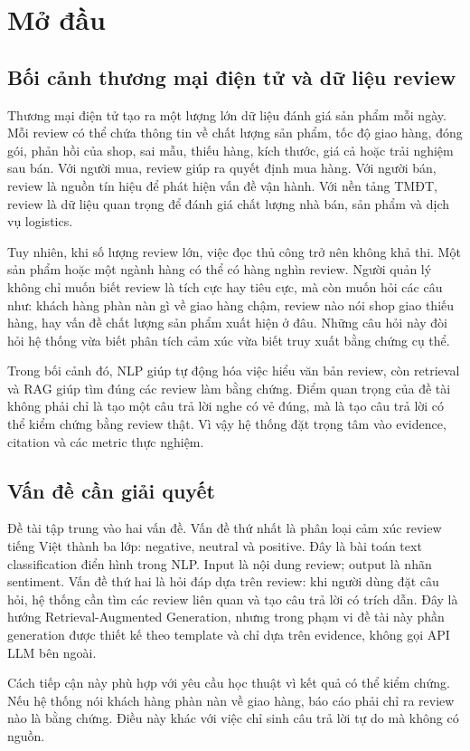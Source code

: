 \chapter{Mở đầu}
\section{Bối cảnh thương mại điện tử và dữ liệu review}
Thương mại điện tử tạo ra một lượng lớn dữ liệu đánh giá sản phẩm mỗi ngày. Mỗi review có thể chứa thông tin về chất lượng sản phẩm, tốc độ giao hàng, đóng gói, phản hồi của shop, sai mẫu, thiếu hàng, kích thước, giá cả hoặc trải nghiệm sau bán. Với người mua, review giúp ra quyết định mua hàng. Với người bán, review là nguồn tín hiệu để phát hiện vấn đề vận hành. Với nền tảng TMĐT, review là dữ liệu quan trọng để đánh giá chất lượng nhà bán, sản phẩm và dịch vụ logistics.

Tuy nhiên, khi số lượng review lớn, việc đọc thủ công trở nên không khả thi. Một sản phẩm hoặc một ngành hàng có thể có hàng nghìn review. Người quản lý không chỉ muốn biết review là tích cực hay tiêu cực, mà còn muốn hỏi các câu như: khách hàng phàn nàn gì về giao hàng chậm, review nào nói shop giao thiếu hàng, hay vấn đề chất lượng sản phẩm xuất hiện ở đâu. Những câu hỏi này đòi hỏi hệ thống vừa biết phân tích cảm xúc vừa biết truy xuất bằng chứng cụ thể.

Trong bối cảnh đó, NLP giúp tự động hóa việc hiểu văn bản review, còn retrieval và RAG giúp tìm đúng các review làm bằng chứng. Điểm quan trọng của đề tài không phải chỉ là tạo một câu trả lời nghe có vẻ đúng, mà là tạo câu trả lời có thể kiểm chứng bằng review thật. Vì vậy hệ thống đặt trọng tâm vào evidence, citation và các metric thực nghiệm.

\section{Vấn đề cần giải quyết}
Đề tài tập trung vào hai vấn đề. Vấn đề thứ nhất là phân loại cảm xúc review tiếng Việt thành ba lớp: negative, neutral và positive. Đây là bài toán text classification điển hình trong NLP. Input là nội dung review; output là nhãn sentiment. Vấn đề thứ hai là hỏi đáp dựa trên review: khi người dùng đặt câu hỏi, hệ thống cần tìm các review liên quan và tạo câu trả lời có trích dẫn. Đây là hướng Retrieval-Augmented Generation, nhưng trong phạm vi đề tài này phần generation được thiết kế theo template và chỉ dựa trên evidence, không gọi API LLM bên ngoài.

Cách tiếp cận này phù hợp với yêu cầu học thuật vì kết quả có thể kiểm chứng. Nếu hệ thống nói khách hàng phàn nàn về giao hàng, báo cáo phải chỉ ra review nào là bằng chứng. Điều này khác với việc chỉ sinh câu trả lời tự do mà không có nguồn.

